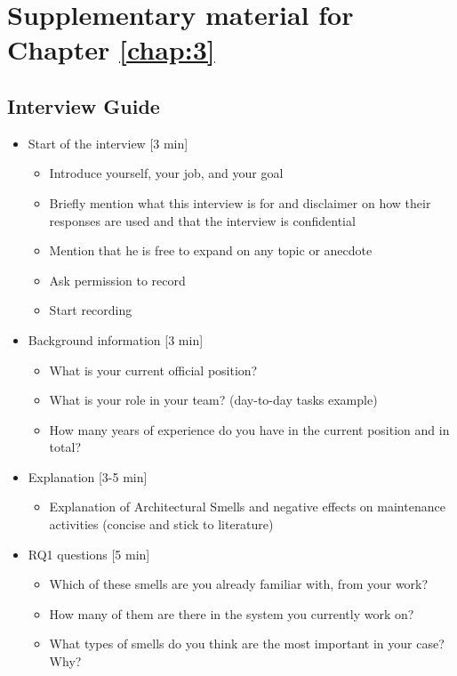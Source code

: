\chapter{Supplementary material for Chapter \ref{chap:3}}\label{c2:appendix}
\section{Interview Guide}
\begin{itemize}
    \item Start of the interview [3 min]
    \begin{itemize}
        \item Introduce yourself, your job, and your goal
        \item Briefly mention what this interview is for and disclaimer on how their responses are used and that the interview is confidential
        \item Mention that he is free to expand on any topic or anecdote
        \item Ask permission to record 
        \item Start recording
    \end{itemize}

    \item Background information [3 min]
    \begin{itemize}
        \item What is your current official position? 
        \item What is your role in your team? (day-to-day tasks example) 
        \item How many years of experience do you have in the current position and in total? 
    \end{itemize}

    \item Explanation [3-5 min]
    \begin{itemize}
        \item Explanation of Architectural Smells and negative effects on maintenance activities (concise and stick to literature) 
    \end{itemize}

    \item RQ1 questions [5 min]
    \begin{itemize}
        \item Which of these smells are you already familiar with, from your work? 
        \item How many of them are there in the system you currently work on?
        \item What types of smells do you think are the most important in your case? Why? 
    \end{itemize}


\end{itemize}
